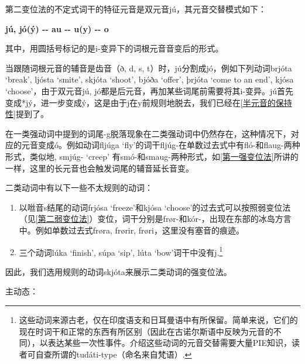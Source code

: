 第二变位法的不定式词干的特征元音是双元音jú，其元音交替模式如下：

\textbf{jú, jó(ý) -\/- au -\/- u(y) -\/- o}

其中，用圆括号标记的是i-变异下的词根元音音变后的形式。

当跟随词根元音的辅音是齿音（ð, d, s,
t）时，jú分割成jó，例如下列动词brjóta `break‌', ljósta `smite‌', skjóta
`shoot‌', bjóða `offer‌', þrjóta `come to an end‌', kjósa
`choose‌'，由于双元音jú,
jó都是后元音，再加某些词尾前需要将其i-变异。jú首先变成*jý，进一步变成ý，这是由于j在y前规则地脱去，我们已经在\ref{半元音的保持性}提到了。

在一类强动词中提到的词尾-g脱落现象在二类强动词中仍然存在，这种情况下，对应的元音变成ó。例如动词fljúga
`fly‌'的词干fljúg-在单数过去式中有fló-和flaug-两种形式，类似地, smjúg-
`creep‌'
有smó-和smaug-两种形式，如\ref{第一强变位法}所讲的一样，这里的长元音也会触发词尾的辅音延长音变。

二类动词中有以下一些不太规则的动词：

\begin{enumerate}
  \def\labelenumi{\arabic{enumi})}
  \item
        以咝音s结尾的动词frjósa `freeze‌'和kjósa
        `choose‌'的过去式可以按照弱变位法（见\ref{第二弱变位法}）变位，词干分别是frør-和kór-，出现在东部的冰岛方言中。例如单数过去式frøra,
        frørir, frøri，这里没有塞音的痕迹。
  \item
        三个动词lúka `finish‌', súpa `sip‌', lúta `bow‌'词干中没有j.\footnote{这些动词来源古老，仅在印度语支和日耳曼语中有所保留。简单来说，它们的现在时词干和正常的东西有所区别（因此在古诺尔斯语中反映为元音的不同），以表达某些一次性事件。介绍这些动词的元音交替需要大量PIE知识，读者可自查所谓的tudáti-type（命名来自梵语）.}
\end{enumerate}

因此，我们选用规则的动词skjóta来展示二类动词的强变位法。

主动态：

